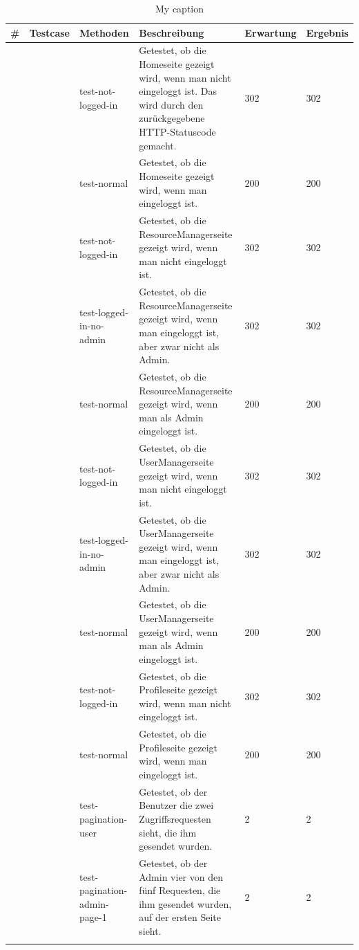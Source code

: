 \documentclass[parskip=full,11pt]{scrartcl}
\begin{document}
\begin{longtable}[c]{|p{0.4cm}|p{2.5cm}|p{3.5cm}|p{5cm}|p{2cm}|p{1.8cm}|}
\caption{My caption}
\label{my-label}\\
\hline
\textbf{\#} & \textbf{Testcase}&\textbf{Methoden}& \textbf{Beschreibung} & \textbf{Erwartung} & \textbf{Ergebnis} \\ \hline
\endfirsthead
%
\endhead
%
\multirow{2}{*}{}1 & \multirow{2}{*}{} TestHomeView & test-not-logged-in & Getestet, ob die Homeseite gezeigt wird, wenn man nicht eingeloggt ist. Das wird durch den zurückgegebene HTTP-Statuscode gemacht.& 302  & 302 \\ \cline{3-6} &   & test-normal & Getestet, ob die Homeseite gezeigt wird, wenn man eingeloggt ist.  & 200 & 200 \\ \hline
\multirow{3}{*}{} 2& \multirow{3}{*}{} TestResourceManager&  test-not-logged-in & Getestet, ob die ResourceManagerseite gezeigt wird, wenn man nicht eingeloggt ist. & 302  & 302  \\ \cline{3-6} & & test-logged-in-no-admin & Getestet, ob die ResourceManagerseite gezeigt wird, wenn man eingeloggt ist, aber zwar nicht als Admin. & 302 & 302 \\ \cline{3-6} & & test-normal & Getestet, ob die ResourceManagerseite gezeigt wird, wenn man als Admin  eingeloggt ist. & 200 & 200  \\ \hline
\multirow{3}{*}{} 3& \multirow{3}{*}{} TestUserManager&  test-not-logged-in & Getestet, ob die UserManagerseite gezeigt wird, wenn man nicht eingeloggt ist. & 302  & 302  \\ \cline{3-6} & & test-logged-in-no-admin & Getestet, ob die UserManagerseite gezeigt wird, wenn man eingeloggt ist, aber zwar nicht als Admin. & 302 & 302 \\ \cline{3-6} & & test-normal & Getestet, ob die UserManagerseite gezeigt wird, wenn man als Admin  eingeloggt ist. & 200 & 200  \\ \hline
\multirow{5}{*}{} 4& \multirow{5}{*}{} TestProfileView& test-not-logged-in & Getestet, ob die Profileseite gezeigt wird, wenn man nicht eingeloggt ist.& 302  & 302 \\ \cline{3-6} &   & test-normal & Getestet, ob die Profileseite gezeigt wird, wenn man eingeloggt ist.  & 200 & 200 \\ \cline{3-6} 
                  &                   & test-pagination-user & Getestet, ob der Benutzer die zwei Zugriffsrequesten sieht, die ihm gesendet wurden. & 2 & 2 \\ \cline{3-6} 
                  &                   & test-pagination-admin-page-1 & Getestet, ob der Admin  vier von den fünf Requesten, die ihm gesendet wurden,  auf der ersten Seite sieht. & 2 & 2 \\ \cline{3-6} 

\end{longtable}
\end{document}
